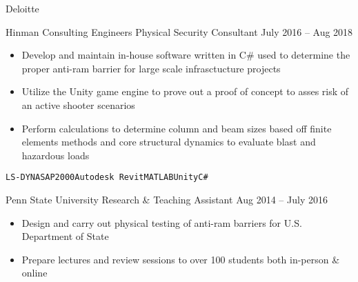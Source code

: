 \documentclass[9pt]{resume} %
\begin{document}
\begin{minipage}[t]{1\textwidth}
\begin{entrylist}{Deloitte}
\end{entrylist}				
				
	\begin{entrylist}{Hinman Consulting Engineers}
	\entry
		{Physical Security Consultant}
		{July 2016 -- Aug 2018}
		{{\begin{itemize}[noitemsep,topsep=0pt,leftmargin=*]
			\item Develop and maintain in-house software written in C\# used to determine the proper anti-ram barrier for large scale infrasctucture projects
			\item Utilize the Unity game engine to prove out a proof of concept to asses risk of an active shooter scenarios
			\item Perform calculations to determine column and beam sizes based off finite elements methods and core structural dynamics to evaluate blast and hazardous loads
		\end{itemize}}		
		{\addtolength{\leftskip}{3mm}\texttt{LS-DYNA}\slashsep\texttt{SAP2000}\slashsep\texttt{Autodesk Revit}\slashsep\texttt{MATLAB}\slashsep\texttt{Unity}\slashsep\texttt{C\#}\par}}
	\end{entrylist}
	
      	\begin{entrylist}{Penn State University}		
	\entry
		{Research \& Teaching Assistant}
		{Aug 2014 -- July 2016}
		{\begin{itemize}[noitemsep,topsep=0pt,leftmargin=*]
			\item Design and carry out physical testing of anti-ram barriers for U.S. Department of State
			\item Prepare lectures and review sessions to over 100 students both in-person \& online\\
		\end{itemize}}
\end{entrylist}		
		

\end{minipage}
\end{document}
